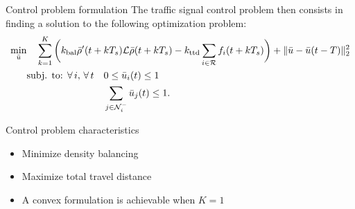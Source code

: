 
\begin{frame}[shrink=9]{Control problem formulation}
    The traffic signal control problem then consists in finding a solution to the following optimization problem:
    \[
    \begin{aligned}
    \min_{\bar{u}} & \quad \sum_{k=1}^{K} \bigg( k_\text{bal}\bar{\rho}'(t+kT_s)\laplacian\bar{\rho}(t+kT_s) -
            k_\text{ttd}\sum_{i\in\roads} f_i(t+kT_s) \bigg)
            + \Vert\bar{u}-\bar{u}(t-T)\Vert_2^2 \\
    & \text{subj. to: } \forall\, i,\, \forall\,t\quad  0\leq\bar{u}_i(t)\leq1\\
                   &\phantom{ \text{subj. to: } \forall\, i,\, \forall\,t\quad} \sum_{j\in\neighUp_i}\bar{u}_j(t)\leq 1.
    \end{aligned}
    \]
    \begin{block}{Control problem characteristics}
        \begin{itemize}
        \item Minimize density balancing
        \item Maximize total travel distance
        \item A convex formulation is achievable when $K=1$
        \end{itemize}
    \end{block}
\end{frame}